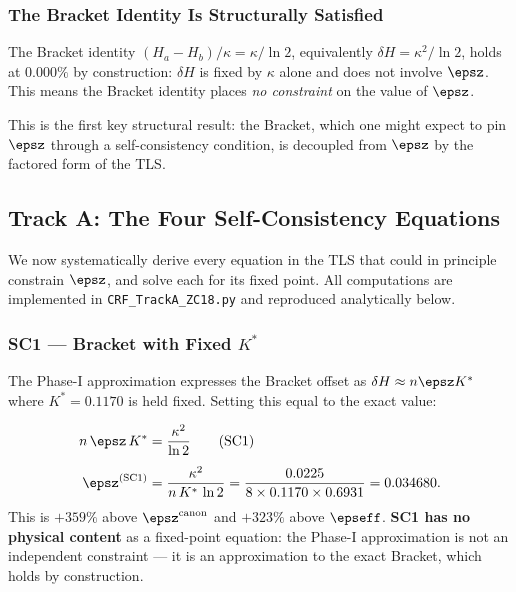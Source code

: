 \documentclass[12pt, a4paper]{article}
\begin{document}
\subsubsection{The Bracket Identity Is Structurally Satisfied}

The Bracket identity $(H_a - H_b)/\kappa = \kappa/\ln 2$, equivalently
$\delta H = \kappa^2/\ln 2$, holds at $0.000\%$ by construction:
$\delta H$ is fixed by $\kappa$ alone and does not involve $\epsz$.
This means the Bracket identity places \emph{no constraint} on the
value of $\epsz$.

This is the first key structural result: the Bracket, which one might
expect to pin $\epsz$ through a self-consistency condition, is
decoupled from $\epsz$ by the factored form of the TLS.

\subsection{Track A: The Four Self-Consistency Equations}
\label{zc18a:sec:trackA}

We now systematically derive every equation in the TLS that could
in principle constrain $\epsz$, and solve each for its fixed point.
All computations are implemented in \texttt{CRF\_TrackA\_ZC18.py}
and reproduced analytically below.

\subsubsection{SC1 — Bracket with Fixed $K^*$}

The Phase-I approximation expresses the Bracket offset as
$\delta H \approx n\epsz K^*$ where $K^* = 0.1170$ is held fixed.
Setting this equal to the exact value:

\begin{derivedbox}[title={SC1: Bracket Approximation Self-Consistency}]
\begin{align}
  n\,\epsz\,K^* &= \frac{\kappa^2}{\ln 2}
  \tag{SC1}\\[4pt]
  \epsz^{(\mathrm{SC1})}
  &= \frac{\kappa^2}{n\,K^*\,\ln 2}
  = \frac{0.0225}{8\times 0.1170\times 0.6931}
  = 0.034680.
\end{align}
This is $+359\%$ above $\epsz^{\rm canon}$ and $+323\%$ above $\epseff$.
\textbf{SC1 has no physical content} as a fixed-point equation:
the Phase-I approximation is not an independent constraint — it is
an approximation to the exact Bracket, which holds by construction.
\end{derivedbox}
\end{document}
